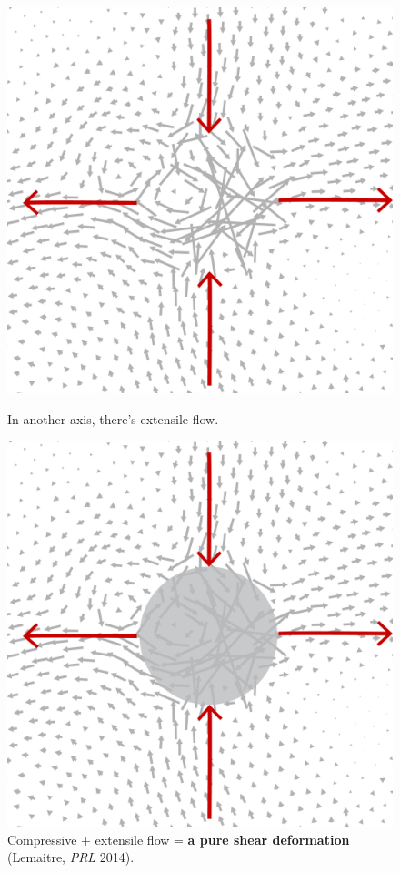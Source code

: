 \begin{frame}[c]
\begin{columns}[T]
\begin{column}[T]{0.4\textwidth}
\begin{figure}[t]
\begin{overprint}
\centering\includegraphics[width=0.85\linewidth]{b.1-exc_pureshear/zoomin-2.pdf}\caption{In another axis, there's extensile flow.}

\centering\includegraphics[width=0.85\linewidth]{b.1-exc_pureshear/zoomin-3.pdf}\caption{Compressive + extensile flow = \textbf{a pure shear deformation} {\footnotesize (Lemaitre, \textit{PRL} 2014).}}


\end{overprint}
\end{figure}
\end{column}
\end{columns}
\end{frame}
